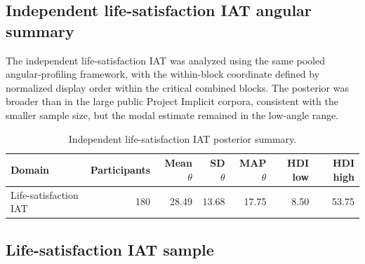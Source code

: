 \documentclass[12pt]{article}
\begin{document}
\begin{table}[htbp]
\centering
\caption{Posterior contrast at six bins: Sexuality minus Gender--Science.}
\label{tab:supp-matched-diff}
\small

\end{table}

\begin{table}[htbp]
\centering
\caption{Leak-free temporal hold-out model comparison for both matched 2019 public domains.}
\label{tab:supp-matched-model}
\footnotesize
\resizebox{\textwidth}{!}{}
\end{table}

\subsection*{Independent life-satisfaction IAT angular summary}

The independent life-satisfaction IAT was analyzed using the same pooled angular-profiling framework, with the within-block coordinate defined by normalized display order within the critical combined blocks. The posterior was broader than in the large public Project Implicit corpora, consistent with the smaller sample size, but the modal estimate remained in the low-angle range.

\begin{table}[htbp]
\centering
\caption{Independent life-satisfaction IAT posterior summary.}
\label{tab:supp-life-theta}
\small
\begin{tabular}{@{}lrrrrrr@{}}
\toprule
Domain & Participants & Mean $\theta$ & SD $\theta$ & MAP $\theta$ & HDI low & HDI high \\
\midrule
Life-satisfaction IAT & 180 & 28.49 & 13.68 & 17.75 & 8.50 & 53.75 \\
\bottomrule
\end{tabular}
\end{table}

\subsection*{Life-satisfaction IAT sample}
\end{document}
